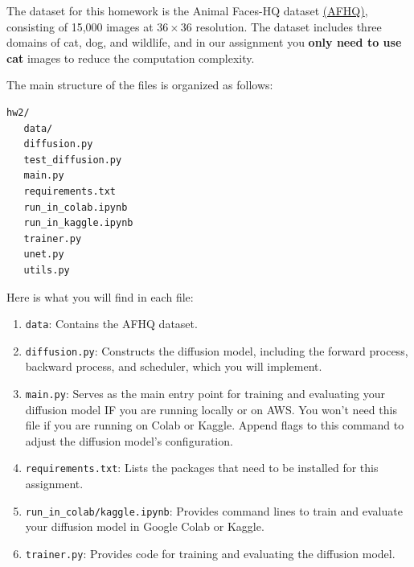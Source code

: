 \documentclass[11pt,addpoints,answers]{exam}
\begin{document}
\begin{questions}
 The dataset for this homework is the Animal Faces-HQ dataset \href{https://github.com/clovaai/stargan-v2/blob/master/README.md#animal-faces-hq-dataset-afhq}{(AFHQ)}, consisting of 15,000 images at $36\times36$ resolution. The dataset includes three domains of cat, dog, and wildlife, and in our assignment you \textbf{only need to use cat} images to reduce the computation complexity.




The main structure of the files is organized as follows:
\begin{verbatim}
hw2/
   data/
   diffusion.py
   test_diffusion.py
   main.py
   requirements.txt
   run_in_colab.ipynb
   run_in_kaggle.ipynb
   trainer.py
   unet.py
   utils.py
\end{verbatim}

Here is what you will find in each file:
\begin{enumerate}
    
    \item \lstinline{data}: Contains the AFHQ dataset.
    
    \item \lstinline{diffusion.py}: Constructs the diffusion model, including the forward process, backward process, and scheduler, which you will implement.


    \item \lstinline{main.py}: Serves as the main entry point for training and evaluating your diffusion model IF you are running locally or on AWS. You won't need this file if you are running on Colab or Kaggle. Append flags to this command to adjust the diffusion model's configuration.
    
    \item \lstinline{requirements.txt}: Lists the packages that need to be installed for this assignment.
    
    \item \lstinline{run_in_colab/kaggle.ipynb}: Provides command lines to train and evaluate your diffusion model in Google Colab or Kaggle.
    
    \item \lstinline{trainer.py}: Provides code for training and evaluating the diffusion model.
    

\end{enumerate}
\end{questions}
\end{document}
